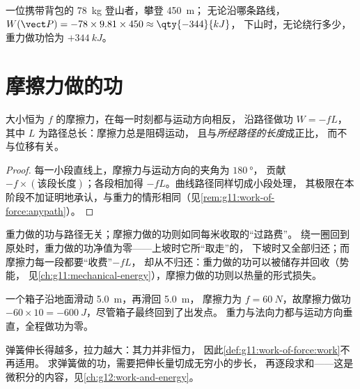 \begin{example}[登山者]\label{ex:g11:work-of-force:hiker}
一位携带背包的 \qty{78}{kg} 登山者，攀登 \qty{450}{m}；
无论沿哪条路线，$W(\vect P) = -78 \times 9.81 \times 450 \approx \qty{-344}{kJ}$，
下山时，无论绕行多少，重力做功恰为 $+\qty{344}{kJ}$。
\end{example}

\section{摩擦力做的功}

\begin{proposition}[滑动摩擦力做的功]\label{prop:g11:work-of-force:friction}
大小恒为 $f$ 的摩擦力，在每一时刻都与运动方向相反，
沿路径做功 $W = -fL$，其中 $L$ 为路径总长：摩擦力总是阻碍运动，
且与\emph{所经路径的长度}成正比，
而不与位移有关。
\end{proposition}

\begin{proof}
每一小段直线上，摩擦力与运动方向的夹角为 $\qty{180}{\degree}$，
贡献 $-f \times (\text{该段长度})$；各段相加得
$-fL$。曲线路径同样切成小段处理，
其极限在本阶段不加证明地承认，与重力的情形相同（见\cref{rem:g11:work-of-force:anypath}）。
\end{proof}

\begin{remark}\label{rem:g11:work-of-force:divide}
重力做的功与路径无关；摩擦力做的功则如同每米收取的“过路费”。
绕一圈回到原处时，重力做的功净值为零——上坡时它所“取走”的，
下坡时又全部归还；而摩擦力每一段都要“收费”$-fL$，
却从不归还：重力做的功可以被储存并回收（势能，
见\cref{ch:g11:mechanical-energy}），摩擦力做的功则以热量的形式损失。
\end{remark}

\begin{example}[往返一次]\label{ex:g11:work-of-force:roundtrip}
一个箱子沿地面滑动 \qty{5.0}{m}，再滑回 \qty{5.0}{m}，
摩擦力为 $f = \qty{60}{N}$，故摩擦力做功 $-60 \times 10 =
\qty{-600}{J}$，尽管箱子最终回到了出发点。
重力与法向力都与运动方向垂直，全程做功为零。
\end{example}

\begin{remark}[弹簧呢？]\label{rem:g11:work-of-force:spring}
弹簧伸长得越多，拉力越大：其力并非恒力，
因此\cref{def:g11:work-of-force:work}不再适用。
求弹簧做的功，需要把伸长量切成无穷小的步长，
再逐段求和——这是微积分的内容，见\cref{ch:g12:work-and-energy}。
\end{remark}

